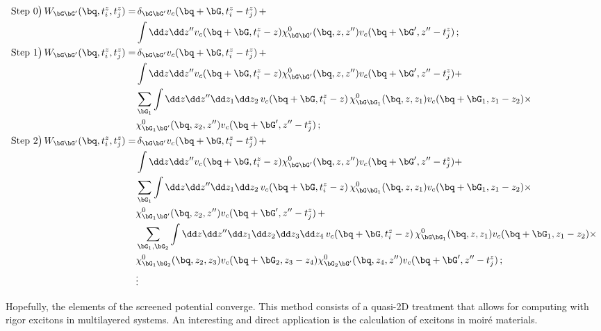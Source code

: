 \begin{align}
\text{Step 0\big)}\,W_{\bG \bG'}(\bq,t_{i}^{z},t_{j}^{z}) =  & \,\delta_{\bG \bG'}v_{c}( \bq +\bG,t_{i}^{z}-t_{j}^{z})\,+  \notag \\
&\int\dd z \dd z'' v_{c}( \bq +\bG,t_{i}^{z}-z)\chi^{0}_{\bG \bG'}(\bq,z,z'')v_{c}( \bq +\bG',z''-t_{j}^{z})  \,; \notag \\
\text{Step 1\big)}\,W_{\bG \bG'}(\bq,t_{i}^{z},t_{j}^{z}) =  & \,\delta_{\bG \bG'}v_{c}( \bq +\bG,t_{i}^{z}-t_{j}^{z})\, +  \notag \\
&\int\dd z \dd z'' v_{c}( \bq +\bG,t_{i}^{z}-z)\chi^{0}_{\bG \bG'}(\bq,z,z'')v_{c}( \bq +\bG',z''-t_{j}^{z})+ \notag\\
 & \sum_{\bG_{1}} \int \dd z \dd z'' \dd z_{1} \dd z_{2} \,v_{c}( \bq +\bG,t_{i}^{z}-z)\,\chi^{0}_{\bG \bG_{1}}(\bq,z,z_{1})v_{c}( \bq +\bG_{1},z_{1}-z_{2})  \times  \notag \\
&\chi^{0}_{\bG_{1} \bG'}(\bq,z_{2},z'') v_{c}( \bq +\bG',z''-t_{j}^{z})  \,; \notag \\
\text{Step 2\big)}\, W_{\bG \bG'}(\bq,t_{i}^{z},t_{j}^{z}) =  & \,\delta_{\bG \bG'}v_{c}( \bq +\bG,t_{i}^{z}-t_{j}^{z})\, +  \notag \\
&\int\dd z \dd z'' v_{c}( \bq +\bG,t_{i}^{z}-z)\chi^{0}_{\bG \bG'}(\bq,z,z'')v_{c}( \bq +\bG',z''-t_{j}^{z})+ \notag \\
& \sum_{\bG_{1}} \int \dd z \dd z'' \dd z_{1} \dd z_{2} \,v_{c}( \bq +\bG,t_{i}^{z}-z)\,\chi^{0}_{\bG \bG_{1}}(\bq,z,z_{1})v_{c}( \bq +\bG_{1},z_{1}-z_{2})  \times  \notag \\
&\chi^{0}_{\bG_{1} \bG'}(\bq,z_{2},z'') v_{c}( \bq +\bG',z''-t_{j}^{z}) \, +  \notag \\
& \sum_{\bG_{1},\bG_{2}} \int\dd z \dd z'' \dd z_{1} \dd z_{2} \dd z_{3} \dd z_{4}\,v_{c}( \bq +\bG,t_{i}^{z}-z)\,\chi^{0}_{\bG \bG_{1}}(\bq,z,z_{1})v_{c}( \bq +\bG_{1},z_{1}-z_{2})\times  \notag \\
 & \chi^{0}_{\bG_{1} \bG_{2}}(\bq,z_{2},z_{3}) v_{c}( \bq +\bG_{2},z_{3}-z_{4})\chi^{0}_{\bG_{2} \bG'}(\bq,z_{4},z'')v_{c}( \bq +\bG',z''-t_{j}^{z})  \,; \\
 & \vdots  \notag
\end{align}

\noindent Hopefully, the elements of the screened potential converge.
This method consists of a quasi-2D treatment that allows for computing with rigor excitons in multilayered systems.
An interesting and direct application is the calculation of excitons in moir\'e materials.